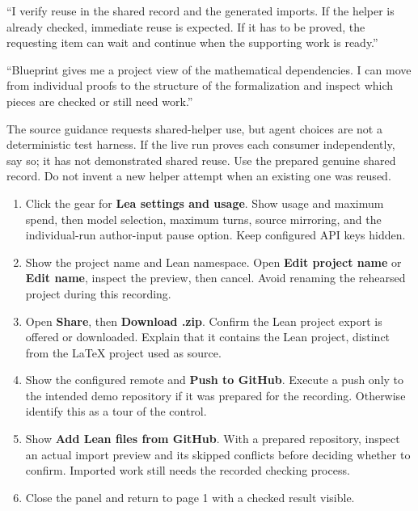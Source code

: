 ``I verify reuse in the shared record and the generated imports. If the
helper is already checked, immediate reuse is expected. If it has to be proved,
the requesting item can wait and continue when the supporting work is ready.''

``Blueprint gives me a project view of the mathematical dependencies. I can
move from individual proofs to the structure of the formalization and inspect
which pieces are checked or still need work.''

\fallback
The source guidance requests shared-helper use, but agent choices are not a
deterministic test harness. If the live run proves each consumer independently,
say so; it has not demonstrated shared reuse. Use the prepared genuine shared
record. Do not invent a new helper attempt when an existing one was reused.

\clearpage
{}

\click
\begin{enumerate}
  \item Click the gear for \textbf{Lea settings and usage}. Show usage and
    maximum spend, then model selection, maximum turns, source mirroring,
    and the individual-run author-input pause option. Keep configured API keys hidden.
  \item Show the project name and Lean namespace. Open \textbf{Edit project name}
    or \textbf{Edit name}, inspect the preview, then cancel. Avoid renaming the
    rehearsed project during this recording.
  \item Open \textbf{Share}, then \textbf{Download .zip}. Confirm the Lean project
    export is offered or downloaded. Explain that it contains the Lean project,
    distinct from the LaTeX project used as source.
  \item Show the configured remote and \textbf{Push to GitHub}. Execute a push
    only to the intended demo repository if it was prepared for the recording.
    Otherwise identify this as a tour of the control.
  \item Show \textbf{Add Lean files from GitHub}. With a prepared repository,
    inspect an actual import preview and its skipped conflicts before deciding
    whether to confirm. Imported work still needs the recorded checking process.
  \item Close the panel and return to page 1 with a checked result visible.
\end{enumerate}

